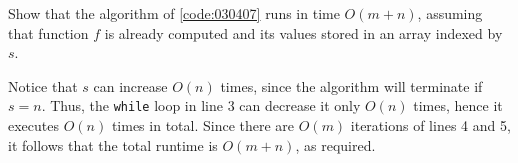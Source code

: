 \begin{exercise}\label{ex:030408}
    Show that the algorithm of \cref{code:030407} runs in time $O(m + n)$,
    assuming that function $f$ is already computed and its values stored in an
    array indexed by $s$.
\end{exercise}
\begin{solution}\label{sol:030408}
    Notice that $s$ can increase $O(n)$ times, since the algorithm will
    terminate if $s = n$. Thus, the \texttt{while} loop in line 3 can decrease
    it only $O(n)$ times, hence it executes $O(n)$ times in total. Since there
    are $O(m)$ iterations of lines 4 and 5, it follows that the total runtime is
    $O(m+n)$, as required.
\end{solution}
